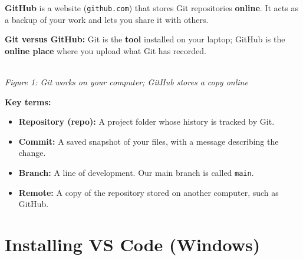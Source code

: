 \documentclass[11pt,a4paper]{article}
\newcommand{\code}[1]{\texttt{#1}}
\newcommand{\figcap}[1]{\\[2pt]{\footnotesize\textit{#1}}}
\begin{document}
\begin{defbox}
\textbf{GitHub} is a website (\code{github.com}) that stores Git repositories \textbf{online}. It acts as a backup of your work and lets you share it with others.
\end{defbox}

\textbf{Git versus GitHub:} Git is the \textbf{tool} installed on your laptop; GitHub is the \textbf{online place} where you upload what Git has recorded.

\begin{center}
\figcap{Figure 1: Git works on your computer; GitHub stores a copy online}
\end{center}

\textbf{Key terms:}
\begin{itemize}
\item \textbf{Repository (repo):} A project folder whose history is tracked by Git.
\item \textbf{Commit:} A saved snapshot of your files, with a message describing the change.
\item \textbf{Branch:} A line of development. Our main branch is called \code{main}.
\item \textbf{Remote:} A copy of the repository stored on another computer, such as GitHub.
\end{itemize}

\section{Installing VS Code (Windows)}
\end{document}
